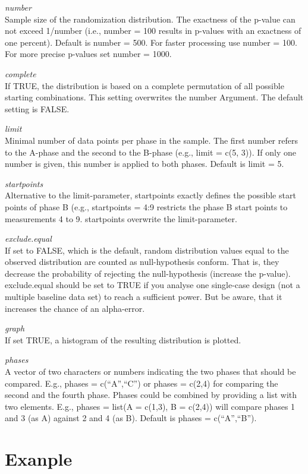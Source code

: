 \documentclass[
  letterpaper,
  DIV=11,
  numbers=noendperiod]{scrreprt}
\begin{document}
\emph{number}\\
Sample size of the randomization distribution. The exactness of the
p-value can not exceed 1/number (i.e., number = 100 results in p-values
with an exactness of one percent). Default is number = 500. For faster
processing use number = 100. For more precise p-values set number =
1000.

\emph{complete}\\
If TRUE, the distribution is based on a complete permutation of all
possible starting combinations. This setting overwrites the number
Argument. The default setting is FALSE.

\emph{limit}\\
Minimal number of data points per phase in the sample. The first number
refers to the A-phase and the second to the B-phase (e.g., limit = c(5,
3)). If only one number is given, this number is applied to both phases.
Default is limit = 5.

\emph{startpoints}\\
Alternative to the limit-parameter, startpoints exactly defines the
possible start points of phase B (e.g., startpoints = 4:9 restricts the
phase B start points to measurements 4 to 9. startpoints overwrite the
limit-parameter.

\emph{exclude.equal}\\
If set to FALSE, which is the default, random distribution values equal
to the observed distribution are counted as null-hypothesis conform.
That is, they decrease the probability of rejecting the null-hypothesis
(increase the p-value). exclude.equal should be set to TRUE if you
analyse one single-case design (not a multiple baseline data set) to
reach a sufficient power. But be aware, that it increases the chance of
an alpha-error.

\emph{graph}\\
If set TRUE, a histogram of the resulting distribution is plotted.

\emph{phases}\\
A vector of two characters or numbers indicating the two phases that
should be compared. E.g., phases = c(``A'',``C'') or phases = c(2,4) for
comparing the second and the fourth phase. Phases could be combined by
providing a list with two elements. E.g., phases = list(A = c(1,3), B =
c(2,4)) will compare phases 1 and 3 (as A) against 2 and 4 (as B).
Default is phases = c(``A'',``B'').

\hypertarget{exanple}{%
\section{Exanple}\label{exanple}}
\end{document}
